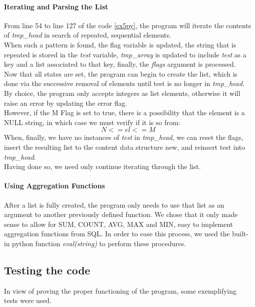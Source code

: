 \documentclass[11pt,a4paper,times]{report}
\begin{document}
\paragraph*{Iterating and Parsing the List}
From line 54 to line 127 of the code \ref{ex5py}, the program will iterate the
contents of \textit{tmp\_head} in search of repeated, sequential elements.\\
When such a pattern is found, the flag variable is updated, the string that is repeated
is stored in the \textit{test} variable, \textit{tmp\_array} is updated to include \textit{test} as a
key and a list associated to that key, finally, the \textit{flags} argument is processed.\\
Now that all states are set, the program can begin to create the list,
which is done via the successive removal of elements until test is no longer
in \textit{tmp\_head}. By choice, the program only accepts integers as list elements,
otherwise it will raise an error by updating the error flag.\\
However, if the M Flag is set to true, there is a possibility that the element
is a NULL string, in which case we must verify if it is so from:
$$N <= el <= M$$
When, finally, we have no instances of \textit{test} in \textit{tmp\_head}, we can reset the flags,
insert the resulting list to the content data structure new, and reinsert test
into \textit{tmp\_head}.\\
Having done so, we need only continue iterating through the list.
\paragraph*{Using Aggregation Functions}
After a list is fully created, the program only needs to use that list as
an argument to another previously defined function. We chose that it only
made sense to allow for SUM, COUNT, AVG, MAX and MIN, easy to implement
aggregation functions from SQL. In order to ease this process, we used the
built-in python function \textit{eval(string)} to perform these procedures.
\subsection{Testing the code}
In view of proving the proper functioning of the program, some exemplifying tests were
used.
\end{document}
